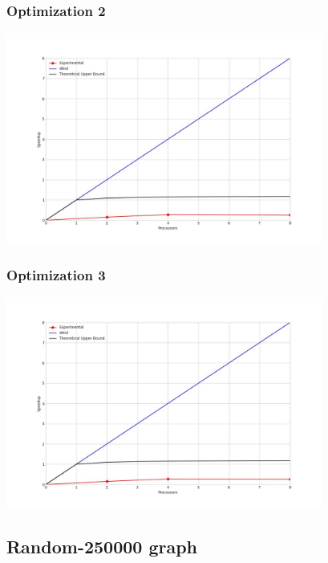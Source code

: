 \subsubsection{Optimization 2}
\begin{center}
    \resizebox{0.8\textwidth}{!}{}
    \includegraphics[width=0.78\textwidth]{../img/speedup-graph_type-random-150000-O2}
\end{center}

\subsubsection{Optimization 3}
\begin{center}
    \resizebox{0.8\textwidth}{!}{}
    \includegraphics[width=0.78\textwidth]{../img/speedup-graph_type-random-150000-O3}
\end{center}

\clearpage
\subsection{Random-250000 graph}
